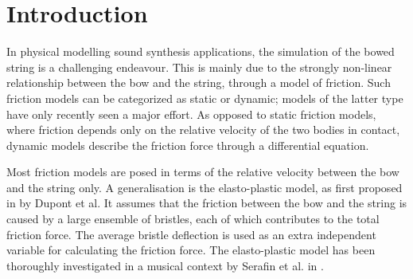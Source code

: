\documentclass[twoside,a4paper,dvipsnames]{article}
\title{\papertitle}
\newif\ifpdf
\begin{document}
\ifpdf %
  \DeclareGraphicsExtensions{.png,.jpg,.pdf, .eps} 
\else  %
\fi

\maketitle
    
\begin{abstract}
The simulation of a bowed string is challenging due to the strongly non-linear relationship between the bow and the string. This relationship can be described through a model of friction. Several friction models in the literature have been proposed, from simple velocity dependent to more accurate ones. Similarily, a highly accurate technique to simulate a stiff string is the use of finite-difference schemes (FDSs). As accuracy implies computational complexity, implementation of these models in real-time is assumed to be a challenge. This paper presents a real-time implementation of the novel combination of a complex friction model, namely the elasto-plastic friction model, and the stiff string simulated using FDSs. We show that it is possible to keep the CPU usage of a single bowed string $<5\%$. For real-time control of the bowed string, the Sensel Morph is used. 
\end{abstract}
\section{Introduction}
\label{sec:intro}
In physical modelling sound synthesis applications, the simulation of the bowed string is a challenging endeavour. This is mainly due to the strongly non-linear relationship between the bow and the string, through a model of friction. Such friction models can be categorized as static or dynamic; models of the latter type have only recently seen a major effort. As opposed to static friction models, where friction depends only on the relative velocity of the two bodies in contact, dynamic models describe the friction force through a differential equation.

Most friction models are posed in terms of the relative velocity between the bow and the string only. A generalisation is the elasto-plastic model, as first proposed in \cite{Dupont2002} by Dupont et al. It assumes that the friction between the bow and the string is caused by a large ensemble of bristles, each of which contributes to the total friction force. The average bristle deflection is used as an extra independent variable for calculating the friction force. The elasto-plastic model has been thoroughly investigated in a musical context by Serafin et al. in \cite{Serafin2004, Serafin2003, Avanzini2005}.
\end{document}
